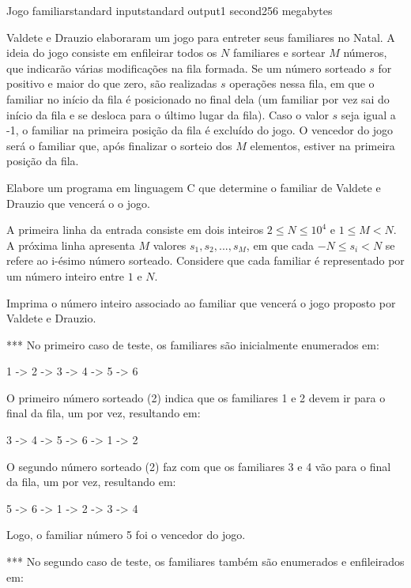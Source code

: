 \begin{problem}{Jogo familiar}{standard input}{standard output}{1 second}{256 megabytes}

Valdete e Drauzio elaboraram um jogo para entreter seus familiares no Natal. A ideia do jogo consiste em enfileirar todos os $N$ familiares e sortear $M$ números, que indicarão várias modificações na fila formada. Se um número sorteado $s$ for positivo e maior do que zero, são realizadas $s$ operações nessa fila, em que o familiar no início da fila é posicionado no final dela (um familiar por vez sai do início da fila e se desloca para o último lugar da fila). Caso o valor $s$ seja igual a -1, o familiar na primeira posição da fila é excluído do jogo. O vencedor do jogo será o familiar que, após finalizar o sorteio dos $M$ elementos, estiver na primeira posição da fila.

Elabore um programa em linguagem C que determine o familiar de Valdete e Drauzio que vencerá o o jogo.


\InputFile
A primeira linha da entrada consiste em dois inteiros $2 \leq N \leq 10^4$ e $1 \leq M < N$. A próxima linha apresenta $M$ valores $s_1, s_2, ... , s_M$, em que cada $-N \leq s_i < N$ se refere ao i-ésimo número sorteado. Considere que cada familiar é representado por um número inteiro entre $1$ e $N$.


\OutputFile
Imprima o número inteiro associado ao familiar que vencerá o jogo proposto por Valdete e Drauzio.

\Examples

\begin{example}
%
%
%
\end{example}

\Note
*** No primeiro caso de teste, os familiares são inicialmente enumerados em:

1 -> 2 -> 3 -> 4 -> 5 -> 6

O primeiro número sorteado (2) indica que os familiares 1 e 2 devem ir para o final da fila, um por vez, resultando em:

3 -> 4 -> 5 -> 6 -> 1 -> 2

O segundo número sorteado (2) faz com que os familiares 3 e 4 vão para o final da fila, um por vez, resultando em:

5 -> 6 -> 1 -> 2 -> 3 -> 4 

Logo, o familiar número 5 foi o vencedor do jogo.

*** No segundo caso de teste, os familiares também são enumerados e enfileirados em:


\end{problem}
